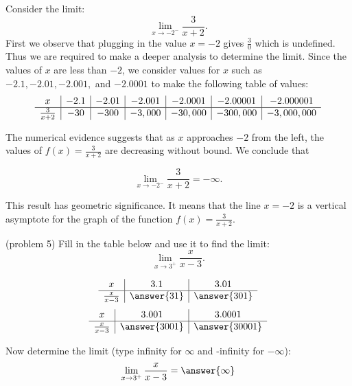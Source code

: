 \documentclass[handout]{ximera}
\begin{document}
\begin{example}[example 5]
Consider the limit:
\[\lim_{x \to -2^-} \frac{3}{x+2}. \]
First we observe that plugging in the value $x=-2$ gives $\frac{3}{0}$ which is undefined. 
Thus we are required to make a deeper analysis to determine the limit.
Since the values of $x$ are less than $-2$, we consider values for $x$ such as 
$-2.1, -2.01, -2.001,$ and $-2.0001$ to make the following table of values:\\

\[
\begin{array}{ c | c | c | c | c| c| c}
  x & -2.1 & -2.01 & -2.001 & -2.0001 & -2.00001 & -2.000001\\ 
	\hline  
	 \frac{3}{x+2} & -30 & -300 & -3,000 & -30,000 & -300,000 & -3,000,000
\end{array}
\] 

The numerical evidence suggests that as $x$ approaches $-2$ from the left, 
the values of $f(x) = \frac{3}{x+2}$ are decreasing without bound. We conclude that 

\[\lim_{x \to -2^-} \frac{3}{x+2} =  -\infty. \]

This result has geometric significance.  
It means that the line $x=-2$ is a vertical asymptote for the graph of the function $f(x) = \frac{3}{x+2}.$
\end{example}



\begin{problem}(problem 5)
Fill in the table below and use it to find the limit:
\[\lim_{x \to 3^+} \frac{x}{x-3}.\]

\begin{prompt}
\begin{center}
\[
\begin{array}{ c | c | c }
  x & 3.1 & 3.01   \\ 
	\hline 
	 \frac{x}{x-3} & \answer{31} & \answer{301} 
\end{array}
\]
\[
\begin{array}{ c | c | c  }
  x  & 3.001 & 3.0001 \\ 
	\hline 
	 \frac{x}{x-3}  & \answer{3001} & \answer{30001}
\end{array}
\]
\end{center}
Now determine the limit (type infinity for $\infty$ and -infinity for $-\infty$):
\[
\lim_{x \to 3^+} \frac{x}{x-3} = \answer{\infty}
\]
\end{prompt}
\end{problem}
\end{document}
